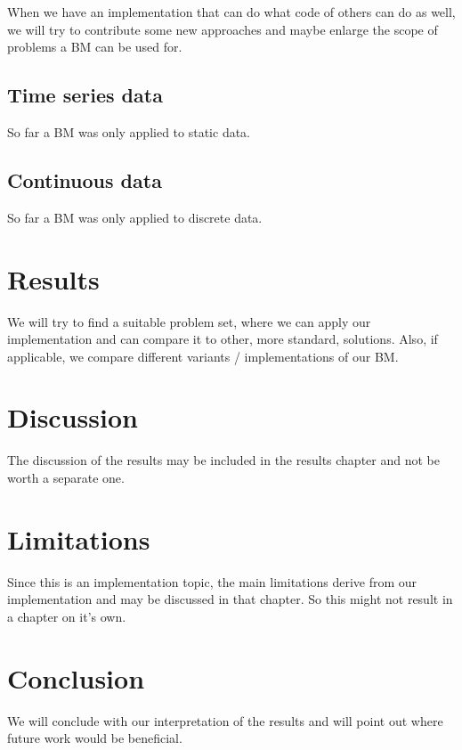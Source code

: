 \documentclass[
	12pt,
	a4paper,
	BCOR10mm,
	DIV14,
	headsepline,
	usegeometry,
]{scrreprt}
\begin{document}
When we have an implementation that can do what code of others can do as well, we will try to contribute some new approaches and maybe enlarge the scope of problems a BM can be used for.


\section{Time series data}

So far a BM was only applied to static data.


\section{Continuous data}

So far a BM was only applied to discrete data.


\chapter{Results}

We will try to find a suitable problem set, where we can apply our implementation and can compare it to other, more standard, solutions. Also, if applicable, we compare different variants / implementations of our BM.


\chapter{Discussion}

The discussion of the results may be included in the results chapter and not be worth a separate one. %


\chapter{Limitations}

Since this is an implementation topic, the main limitations derive from our implementation and may be discussed in that chapter. So this might not result in a chapter on it's own. %


\chapter{Conclusion}

We will conclude with our interpretation of the results and will point out where future work would be beneficial.


\let\clearpage\StandardClearpage




\end{document}
